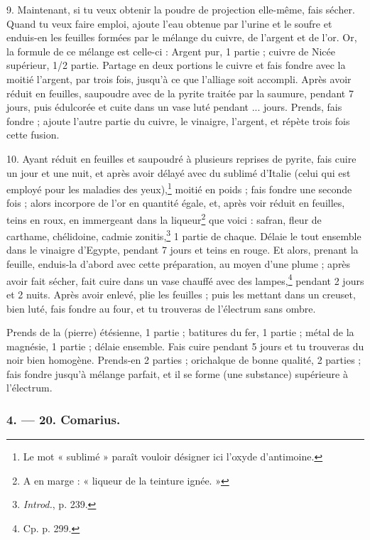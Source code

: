 \documentclass[a4paper, 11pt, oneside, polutonikogreek, french]{article}
\begin{document}
9. Maintenant, si tu veux obtenir la poudre de projection elle-même, fais sécher. Quand tu veux faire emploi, ajoute l'eau obtenue par l'urine et le soufre et enduis-en les feuilles formées par le mélange du cuivre, de l'argent et de l'or. Or, la formule de ce mélange est celle-ci : Argent pur, 1 partie ; cuivre de Nicée supérieur, 1/2 partie. Partage en deux portions le cuivre et fais fondre avec la moitié l'argent, par trois fois, jusqu'à ce que l'alliage soit accompli. Après avoir réduit en feuilles, saupoudre avec de la pyrite traitée par la saumure, pendant 7 jours, puis édulcorée et cuite dans un vase luté pendant ... jours. Prends, fais fondre ; ajoute l'autre partie du cuivre, le vinaigre, l'argent, et répète trois fois cette fusion.

10. Ayant réduit en feuilles et saupoudré à plusieurs reprises de pyrite, fais cuire un jour et une nuit, et après avoir délayé avec du sublimé d'Italie (celui qui est employé pour les maladies des yeux),\footnote{Le mot « sublimé » paraît vouloir désigner ici l'oxyde d'antimoine.} moitié en poids ; fais fondre une seconde fois ; alors incorpore de l'or en quantité égale, et, après voir réduit en feuilles, teins en roux, en immergeant dans la liqueur\footnote{A en marge : « liqueur de la teinture ignée. »} que voici : safran, fleur de carthame, chélidoine, cadmie zonitis,\footnote{\emph{Introd.}, p. 239.} 1 partie de chaque. Délaie le tout ensemble dans le vinaigre d'Egypte, pendant 7 jours et teins en rouge. Et alors, prenant la feuille, enduis-la d'abord avec cette préparation, au moyen d'une plume ; après avoir fait sécher, fait cuire dans un vase chauffé avec des lampes,\footnote{Cp. p. 299.} pendant 2 jours et 2 nuits. Après avoir enlevé, plie les feuilles ; puis les mettant dans un creuset, bien luté, fais fondre au four, et tu trouveras de l'électrum sans ombre.

Prends de la (pierre) étésienne, 1 partie ; batitures du fer, 1 partie ; métal de la magnésie, 1 partie ; délaie ensemble. Fais cuire pendant 5 jours et tu trouveras du noir bien homogène. Prends-en 2 parties ; orichalque de bonne qualité, 2 parties ; fais fondre jusqu'à mélange parfait, et il se forme (une substance) supérieure à l'électrum.

\bigskip
\centerline{\EightStarTaper}
\centerline{\EightStarTaper\EightStarTaper}
\bigskip

\subsubsection{4. --- 20. Comarius.}
\end{document}
